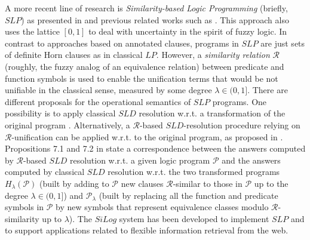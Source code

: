 \documentclass{sigplanconf}
\newcommand{\simrel}{\mathcal{R}}
\newcommand{\extended}[2]{H_{#1}(#2)} \newcommand{\abstracted}[2]{{#1}_{#2}}
\newcommand{\Prog}{\mathcal{P}} \newcommand{\UProg}{\mathcal{P_U}}
\theoremstyle{definition}
\theoremstyle{plain}
\begin{document}
A more recent line of research is {\em Similarity-based Logic Programming}  (briefly, $SLP$) as presented in \cite{Ses02} and previous related works such as \cite{AF99,GS99,FGS00,Ses01}. This approach also uses the lattice $[0,1]$ to deal with uncertainty in the spirit of fuzzy logic. In contrast to approaches based on annotated clauses, programs in $SLP$ are just sets of definite Horn clauses as in classical $LP$. However, a {\em similarity relation} $\simrel$ (roughly, the fuzzy analog of an equivalence relation) between predicate and function symbols is used to enable the
unification terms that would be not unifiable in the classical sense, measured by some degree $\lambda \in (0,1]$. There are different proposals for the operational semantics of $SLP$ programs. One possibility is to apply  classical $SLD$ resolution w.r.t. a transformation of the original program \cite{GS99,Ses01,Ses02}. Alternatively, a $\simrel$-based $SLD$-resolution procedure relying on $\simrel$-unification can be applied w.r.t. to the original program, as proposed in \cite{Ses02}. Propositions 7.1 and 7.2 in \cite{Ses02} state a correspondence between the answers computed by
$\simrel$-based $SLD$ resolution w.r.t. a given logic program $\Prog$ and the answers computed by classical $SLD$ resolution w.r.t. the two transformed programs $\extended{\lambda}{\Prog}$ (built by adding to $\Prog$ new clauses $\simrel$-similar to those in $\Prog$ up to the degree $\lambda \in (0,1]$) and $\abstracted{\Prog}{\lambda}$ (built by replacing all the function and predicate symbols in $\Prog$ by new symbols that represent
equivalence classes modulo $\simrel$-similarity up to $\lambda$). The $SiLog$ system  \cite{LSS04} has been developed to implement $SLP$ and to support applications related to flexible information retrieval from the web.
\end{document}
